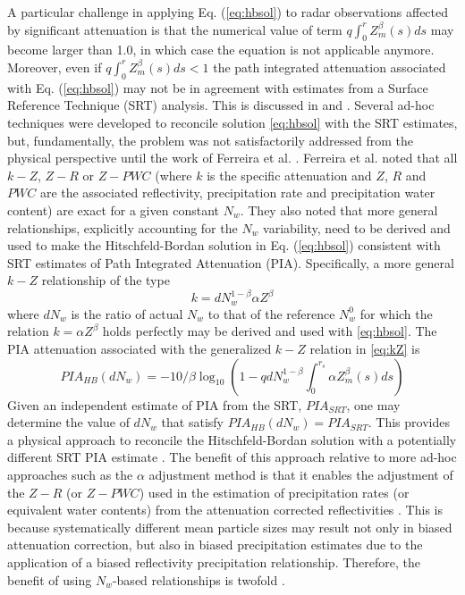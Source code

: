 \documentclass[10pt]{ietbook}
\begin{document}
A particular challenge in applying Eq. (\ref{eq:hbsol}) to radar observations affected by significant attenuation is
that the numerical value of term $q\int_0^r Z_m^\beta(s)ds$ may become larger than 1.0, in which case the equation
is not applicable anymore. Moreover, even if $q\int_0^r Z_m^\beta(s)ds<1$ the path integrated attenuation associated
with Eq. (\ref{eq:hbsol}) may not be in agreement with estimates from a Surface Reference Technique (SRT) analysis.  This
is discussed in \cite{marzoug1991} and \cite{iguchi_meneghini_1994}.  Several ad-hoc techniques were developed to 
reconcile solution \ref{eq:hbsol} with the SRT estimates, but, fundamentally, the problem was not satisfactorily 
addressed from the physical perspective until the work of Ferreira et al. \cite{ferreira2001}. 
Ferreira et al. \cite{ferreira2001} noted that all $k-Z$, $Z-R$ or $Z-PWC$ (where $k$ is the specific attenuation
and $Z$, $R$ and $PWC$ are the associated reflectivity, precipitation rate and precipitation water content) are 
exact for a given constant $N_w$.  They also noted that more general relationships, explicitly accounting for the $N_w$
variability, need to be derived and used to make the Hitschfeld-Bordan 
solution in Eq. (\ref{eq:hbsol}) consistent with SRT estimates of Path Integrated Attenuation (PIA).  Specifically,
a more general $k-Z$ relationship of the type
\begin{equation} \label{eq:kZ}
k=dN_w^{1-\beta} \alpha Z^{\beta}
\end{equation}
where $dN_w$ is the ratio of actual $N_w$ to that of the reference $N_{w}^0$ for which the relation $k=\alpha Z^{\beta}$ 
holds perfectly may be derived and used with \ref{eq:hbsol}.  The PIA attenuation associated with the generalized 
$k-Z$ relation in  \ref{eq:kZ} is
\begin{equation} \label{eq:PIA}
PIA_{HB}(dN_w)=-10/\beta \log_{10}(1-q dN_w^{1-\beta} \int_0^{r_s}\alpha Z_m^\beta(s)ds)
\end{equation}
Given an independent estimate of PIA from the SRT, $PIA_{SRT}$, one may determine the value of $dN_w$ that satisfy
$PIA_{HB}(dN_w)=PIA_{SRT}$.  This provides a physical approach to reconcile the Hitschfeld-Bordan solution with a potentially
different SRT PIA estimate \cite{ferreira2001}.  The benefit of this approach relative to more ad-hoc approaches such
as the $\alpha$ adjustment method \cite{iguchi_meneghini_1994} is that it enables the adjustment of the $Z-R$ 
(or $Z-PWC$) used in the estimation of precipitation rates (or equivalent water contents) from the attenuation corrected
reflectivities \cite{ferreira2001}. This is because systematically different mean particle sizes may result not only
in biased attenuation correction,  but also in biased precipitation estimates due to the application of a biased reflectivity
precipitation relationship.  Therefore, the benefit of using $N_w$-based relationships is twofold \cite{ferreira2001}.
\end{document}
